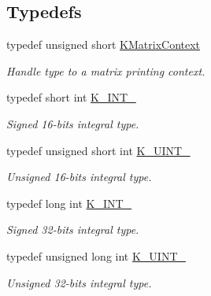 \subsection*{Typedefs}
\begin{DoxyCompactItemize}
\item 
\mbox{\label{namespaceKalman_a7c967f82c4d1bd0565bf8ce864a32fa2}} 
typedef unsigned short \mbox{\hyperlink{namespaceKalman_a7c967f82c4d1bd0565bf8ce864a32fa2}{K\+Matrix\+Context}}
\begin{DoxyCompactList}\small\item\em Handle type to a matrix printing context. \end{DoxyCompactList}\item 
\mbox{\label{namespaceKalman_aa8df9acf5760aceca4e61434d3a67e6f}} 
typedef short int \mbox{\hyperlink{namespaceKalman_aa8df9acf5760aceca4e61434d3a67e6f}{K\+\_\+\+I\+N\+T\+\_}}
\begin{DoxyCompactList}\small\item\em Signed 16-\/bits integral type. \end{DoxyCompactList}\item 
\mbox{\label{namespaceKalman_aceb685f8ded05b4c6725ce3635c4c050}} 
typedef unsigned short int \mbox{\hyperlink{namespaceKalman_aceb685f8ded05b4c6725ce3635c4c050}{K\+\_\+\+U\+I\+N\+T\+\_}}
\begin{DoxyCompactList}\small\item\em Unsigned 16-\/bits integral type. \end{DoxyCompactList}\item 
\mbox{\label{namespaceKalman_a64d6a980ab2a5b7147900e2484a3cf16}} 
typedef long int \mbox{\hyperlink{namespaceKalman_a64d6a980ab2a5b7147900e2484a3cf16}{K\+\_\+\+I\+N\+T\+\_}}
\begin{DoxyCompactList}\small\item\em Signed 32-\/bits integral type. \end{DoxyCompactList}\item 
\mbox{\label{namespaceKalman_a628a50cae10f6e2035393d4f96c698bd}} 
typedef unsigned long int \mbox{\hyperlink{namespaceKalman_a628a50cae10f6e2035393d4f96c698bd}{K\+\_\+\+U\+I\+N\+T\+\_}}
\begin{DoxyCompactList}\small\item\em Unsigned 32-\/bits integral type. \end{DoxyCompactList}\item 

\end{DoxyCompactItemize}
